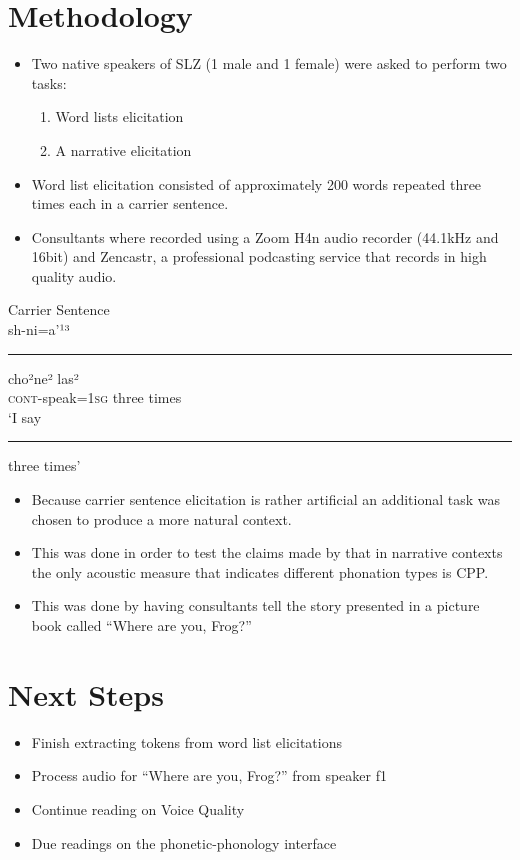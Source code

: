 \documentclass[12pt, letterpaper]{article}
\begin{document}
\section{Methodology} \label{sec:Methodology}
\begin{itemize}
	\item Two native speakers of SLZ (1 male and 1 female) were asked to perform two tasks: 	
	\begin{enumerate}
		\item Word lists elicitation
		\item A narrative elicitation
	\end{enumerate}

	\item Word list elicitation consisted of approximately 200 words repeated three times each in a carrier sentence. 
	\item Consultants where recorded using a Zoom H4n audio recorder (44.1kHz and 16bit) and Zencastr, a professional podcasting service that records in high quality audio. 
\end{itemize}

\ea Carrier Sentence \label{ex:carrier}\\
\gll sh-ni=a'¹³ \rule{10mm}{1pt} cho²ne² las²\\ 
\textsc{cont}-speak=1\textsc{sg} {} three times\\
\trans `I say \rule{10mm}{1pt} three times'	
\z 

\begin{itemize}
	\item Because carrier sentence elicitation is rather artificial an additional task was chosen to produce a more natural context. 
	\item This was done in order to test the claims made by \citet{garellekPhoneticsWhiteHmong2021} that in narrative contexts the only acoustic measure that indicates different phonation types is CPP.
	\item This was done by having consultants tell the story presented in a picture book called ``Where are you, Frog?''
\end{itemize}
\section{Next Steps} \label{sec:Methodology}
\begin{itemize}
	\item Finish extracting tokens from word list elicitations
	\item Process audio for ``Where are you, Frog?'' from speaker f1
	\item Continue reading \citet{eslingVoiceQualityLaryngeal2019} on Voice Quality
	\item Due readings on the phonetic-phonology interface \citep{keatingPhonologyphoneticsInterface1996,kingstonPhoneticsPhonologyInterface2007,zsigaPhonologyPhoneticsInterface2020}
\end{itemize}
\end{document}
